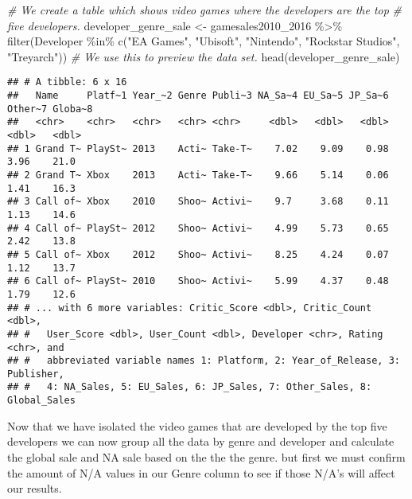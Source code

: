 \documentclass[
]{article}
\newenvironment{Shaded}{\begin{snugshade}}{\end{snugshade}}
\newcommand{\CommentTok}[1]{\textcolor[rgb]{0.56,0.35,0.01}{\textit{#1}}}
\newcommand{\FunctionTok}[1]{\textcolor[rgb]{0.00,0.00,0.00}{#1}}
\newcommand{\NormalTok}[1]{#1}
\newcommand{\OtherTok}[1]{\textcolor[rgb]{0.56,0.35,0.01}{#1}}
\newcommand{\SpecialCharTok}[1]{\textcolor[rgb]{0.00,0.00,0.00}{#1}}
\newcommand{\StringTok}[1]{\textcolor[rgb]{0.31,0.60,0.02}{#1}}
\begin{document}
\begin{Shaded}
\begin{Highlighting}[]
\CommentTok{\# We create a table which shows video games where the developers are the top}
\CommentTok{\# five developers.}
\NormalTok{developer\_genre\_sale }\OtherTok{\textless{}{-}}\NormalTok{ gamesales2010\_2016 }\SpecialCharTok{\%\textgreater{}\%}
    \FunctionTok{filter}\NormalTok{(Developer }\SpecialCharTok{\%in\%} \FunctionTok{c}\NormalTok{(}\StringTok{"EA Games"}\NormalTok{, }\StringTok{"Ubisoft"}\NormalTok{, }\StringTok{"Nintendo"}\NormalTok{, }\StringTok{"Rockstar Studios"}\NormalTok{,}
        \StringTok{"Treyarch"}\NormalTok{))}
\CommentTok{\# We use this to preview the data set.}
\FunctionTok{head}\NormalTok{(developer\_genre\_sale)}
\end{Highlighting}
\end{Shaded}

\begin{verbatim}
## # A tibble: 6 x 16
##   Name     Platf~1 Year_~2 Genre Publi~3 NA_Sa~4 EU_Sa~5 JP_Sa~6 Other~7 Globa~8
##   <chr>    <chr>   <chr>   <chr> <chr>     <dbl>   <dbl>   <dbl>   <dbl>   <dbl>
## 1 Grand T~ PlaySt~ 2013    Acti~ Take-T~    7.02    9.09    0.98    3.96    21.0
## 2 Grand T~ Xbox    2013    Acti~ Take-T~    9.66    5.14    0.06    1.41    16.3
## 3 Call of~ Xbox    2010    Shoo~ Activi~    9.7     3.68    0.11    1.13    14.6
## 4 Call of~ PlaySt~ 2012    Shoo~ Activi~    4.99    5.73    0.65    2.42    13.8
## 5 Call of~ Xbox    2012    Shoo~ Activi~    8.25    4.24    0.07    1.12    13.7
## 6 Call of~ PlaySt~ 2010    Shoo~ Activi~    5.99    4.37    0.48    1.79    12.6
## # ... with 6 more variables: Critic_Score <dbl>, Critic_Count <dbl>,
## #   User_Score <dbl>, User_Count <dbl>, Developer <chr>, Rating <chr>, and
## #   abbreviated variable names 1: Platform, 2: Year_of_Release, 3: Publisher,
## #   4: NA_Sales, 5: EU_Sales, 6: JP_Sales, 7: Other_Sales, 8: Global_Sales
\end{verbatim}

Now that we have isolated the video games that are developed by the top
five developers we can now group all the data by genre and developer and
calculate the global sale and NA sale based on the the the genre. but
first we must confirm the amount of N/A values in our Genre column to
see if those N/A's will affect our results.

\begin{Shaded}
\end{Shaded}
\end{document}
